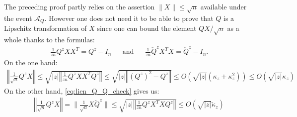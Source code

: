 \documentclass[a4papaer, titlepage]{book}
\begin{document}
\begin{remark}\label{rem:XX_borne_not_needed}
  The preceding proof partly relies on the assertion $\| X\| \leq \sqrt n$ available under the event $\mathcal A_Q$. However one does not need it to be able to prove that $Q$ is a Lipschitz transformation of $X$ since one can bound the element $QX/\sqrt n$ as a whole thanks to the formulas:
  \begin{align}\label{eq:formume_Q_check}
  \frac{1}{zn} Q^zXX^T =  Q^ z - I_n&
  &\text{and}&
  &\frac{1}{zn}\check Q^zX^TX =  \check Q^ z - I_n.
\end{align}
On the one hand:
\begin{align*}
  \left\Vert \frac{1}{\sqrt n}Q^zX  \right\Vert 
  \leq \sqrt{|z|\left\Vert \frac{1}{zn}Q^zXX^TQ^z \right\Vert }
  \leq \sqrt{|z| \left\Vert (Q^z)^2-Q^z \right\Vert }
  \leq O(\sqrt {|z|}(\kappa_z + \kappa_z^2)) \leq O(\sqrt {|z|}\kappa_z)
\end{align*} 
On the other hand, \eqref{eq:lien_Q_Q_check} gives us:
\begin{align*}
  \left\Vert \frac{1}{\sqrt n}Q^zX \right\Vert 
  =\|\frac{1}{\sqrt n}X\check Q^z \| 
  \leq \sqrt{|z|\left\Vert \frac{1}{zn}Q^zX^TXQ^z \right\Vert }
  \leq O(\sqrt {|z|}\check \kappa_z)
\end{align*}
\end{remark}
\end{document}
